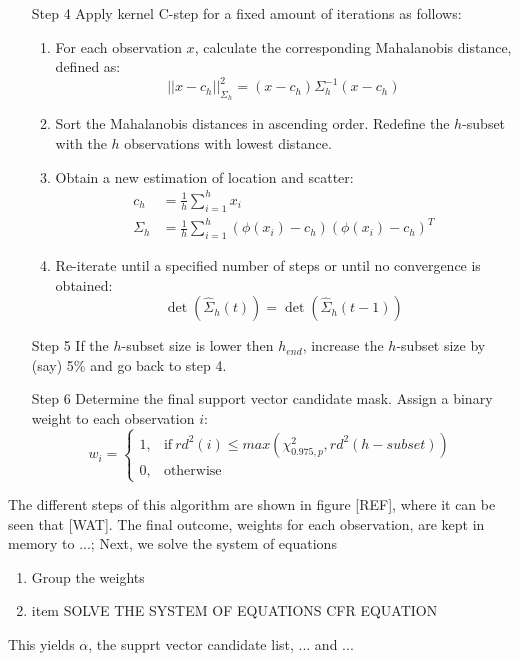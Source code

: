 \documentclass[preprint,12pt]{elsarticle}
\begin{document}
\begin{itemize}
	\item [Step 4] Apply kernel C-step for a fixed amount of iterations as follows:
	\begin{enumerate}	
		\item For each observation $x$, calculate the corresponding Mahalanobis distance, defined as:
		\begin{equation}
		||x - c_h||^2_{\Sigma_h} = (x - c_h) \Sigma^{-1}_h (x - c_h)
		\end{equation}	
		\item Sort the Mahalanobis distances in ascending order. Redefine the $h$-subset with the $h$ observations with lowest distance. 
		\item Obtain a new estimation of location and scatter:
		\begin{align}
		c_h &= \frac{1}{h} \sum_{i=1}^{h}x_i \\
		\Sigma_h &= \frac{1}{h} \sum_{i=1}^{h} (\phi(x_i) - c_h) (\phi(x_i) - c_h)^T 
		\end{align}
		
		\item Re-iterate until a specified number of steps or until no convergence is obtained:
		\begin{equation}
		\det(\hat{\Sigma}_h(t))=\det(\hat{\Sigma}_h(t-1))
		\end{equation}
	\end{enumerate}
	\item [Step 5] If the $h$-subset size is lower then $h_{end}$, increase the $h$-subset size by (say) 5\% and go back to step 4. 
	\item [Step 6] Determine the final support vector candidate mask. Assign a binary weight to each observation $i$:
	\begin{equation}
	w_i =
	\begin{cases}
	1, & \text{if}\ rd^2(i) \leq max(\chi^2_{0.975, p}, rd^2(h-subset)) \\
	0, & \text{otherwise}
	\end{cases}
	\end{equation}
\end{itemize}
The different steps of this algorithm are shown in figure [REF], where it can be seen that [WAT]. The final outcome, weights for each observation, are kept in memory to ...; Next, we solve the system of equations

\begin{enumerate}
	\item Group the weights
	\item item SOLVE THE SYSTEM OF EQUATIONS CFR EQUATION 
\end{enumerate}
This yields $\alpha$, the supprt vector candidate list,  ... and ...
\end{document}
